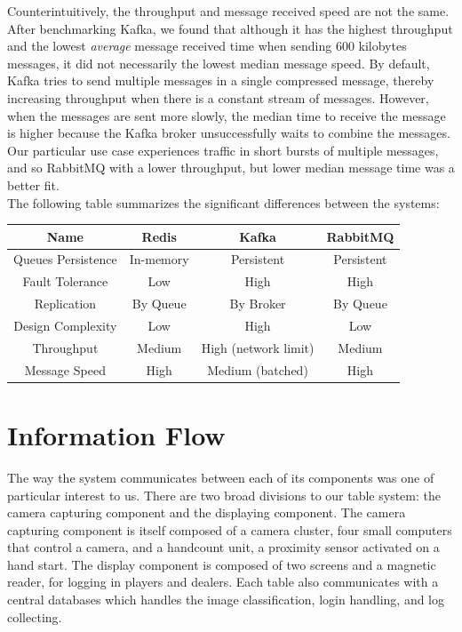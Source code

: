 \documentclass[12pt]{report}
\begin{document}
Counterintuitively, the throughput and message received speed are not the same. After benchmarking Kafka, we found that although it has the highest throughput and the lowest \textit{average} message received time when sending 600 kilobytes messages, it did not necessarily the lowest median message speed. By default, Kafka tries to send multiple messages in a single compressed message, thereby increasing throughput when there is a constant stream of messages. However, when the messages are sent more slowly, the median time to receive the message is higher because the Kafka broker unsuccessfully waits to combine the messages. Our particular use case experiences traffic in short bursts of multiple messages, and so RabbitMQ with a lower throughput, but lower median message time was a better fit.\\

\newpage
The following table summarizes the significant differences between the systems:
\begin{center}
\begin{tabular}{ |c|c|c|c| }
 \hline
 Name & \textbf{Redis} & \textbf{Kafka} & \textbf{RabbitMQ} \\ \hline
 Queues Persistence & In-memory & Persistent & Persistent\\ \hline
 Fault Tolerance & Low & High & High\\ \hline
 Replication & By Queue & By Broker  & By Queue \\ \hline
 Design Complexity & Low & High & Low \\ \hline
 Throughput & Medium & High (network limit) & Medium \\ \hline
 Message Speed & High & Medium (batched) & High \\ \hline 
\end{tabular}
\end{center}

\newpage\thispagestyle{fancy}\sectionfont{\scshape}
\section*{Information Flow}
\par

The way the system communicates between each of its components was one of particular interest to us. There are two broad divisions to our table system: the camera capturing component and the displaying component. The camera capturing component is itself composed of a camera cluster, four small computers that control a camera, and a handcount unit, a proximity sensor activated on a hand start. The display component is composed of two screens and a magnetic reader, for logging in players and dealers. Each table also communicates with a central databases which handles the image classification, login handling, and log collecting.
\end{document}
